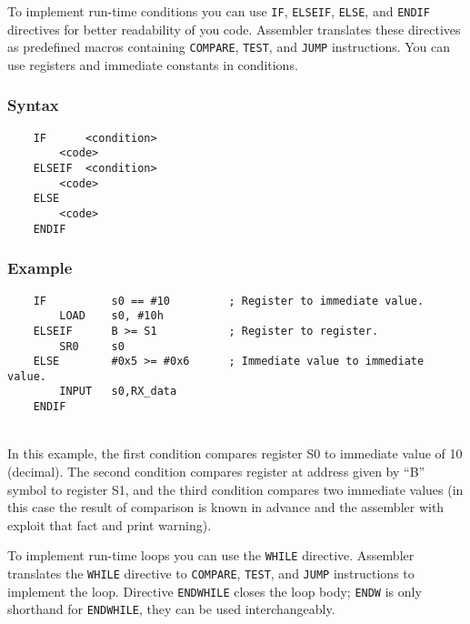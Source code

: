     \clearpage
        To implement run-time conditions you can use \texttt{IF}, \texttt{ELSEIF}, \texttt{ELSE}, and \texttt{ENDIF} directives for better readability of you code. Assembler translates these directives as predefined macros containing \texttt{COMPARE}, \texttt{TEST}, and \texttt{JUMP} instructions. You can use registers and immediate constants in conditions.

        \subsubsection{Syntax}
            \verb'    IF      <condition>'\\
            \verb'        <code>'\\
            \verb'    ELSEIF  <condition>'\\
            \verb'        <code>'\\
            \verb'    ELSE'\\
            \verb'        <code>'\\
            \verb'    ENDIF'

        \subsubsection{Example}
            \verb'    IF          s0 == #10         ; Register to immediate value.'\\
            \verb'        LOAD    s0, #10h'\\
            \verb'    ELSEIF      B >= S1           ; Register to register.'\\
            \verb'        SR0     s0'\\
            \verb'    ELSE        #0x5 >= #0x6      ; Immediate value to immediate value.'\\
            \verb'        INPUT   s0,RX_data'\\
            \verb'    ENDIF'

            ~\\In this example, the first condition compares register S0 to immediate value of 10 (decimal). The second condition compares register at address given by ``B'' symbol to register S1, and the third condition compares two immediate values (in this case the result of comparison is known in advance and the assembler with exploit that fact and print warning).

    \clearpage
        To implement run-time loops you can use the \texttt{WHILE} directive. Assembler translates the \texttt{WHILE} directive to \texttt{COMPARE}, \texttt{TEST}, and \texttt{JUMP} instructions to implement the loop. Directive \texttt{ENDWHILE} closes the loop body; \texttt{ENDW} is only shorthand for \texttt{ENDWHILE}, they can be used interchangeably.

